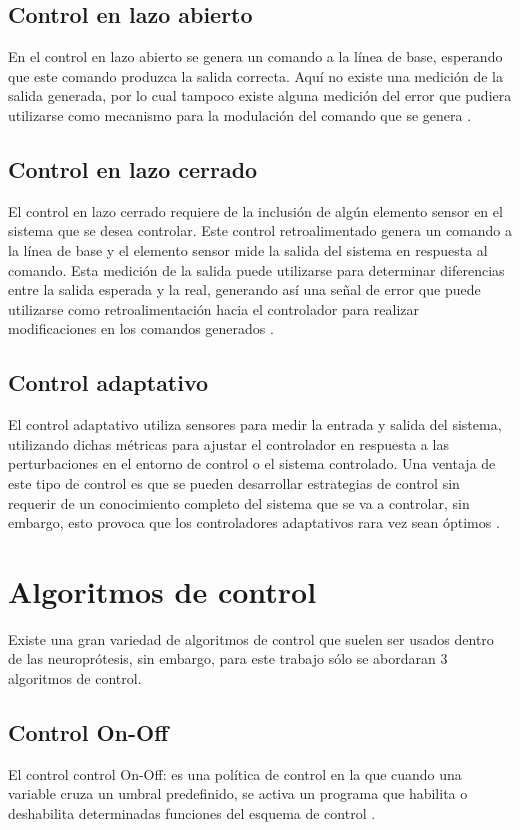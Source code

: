 \subsection{Control en lazo abierto}
En el control en lazo abierto se genera un comando a la línea de base, esperando que este comando produzca la salida correcta. Aquí no existe una medición de la salida generada, por lo cual tampoco existe alguna medición del error que pudiera utilizarse como mecanismo para la modulación del comando que se genera \cite{Wright2016}.

\subsection{Control en lazo cerrado}
El control en lazo cerrado requiere de la inclusión de algún elemento sensor en el sistema que se desea controlar. Este control retroalimentado genera un comando a la línea de base y el elemento sensor mide la salida del sistema en respuesta al comando. Esta medición de la salida puede utilizarse para determinar diferencias entre la salida esperada y la real, generando así una señal de error que puede utilizarse como retroalimentación hacia el controlador para realizar modificaciones en los comandos generados \cite{Wright2016}.

\subsection{Control adaptativo}
El control adaptativo utiliza sensores para medir la entrada y salida del sistema, utilizando dichas métricas para ajustar el controlador en respuesta a las perturbaciones en el entorno de control o el sistema controlado. Una ventaja de este tipo de control es que se pueden desarrollar estrategias de control sin requerir de un conocimiento completo del sistema que se va a controlar, sin embargo, esto provoca que los controladores adaptativos rara vez sean óptimos \cite{Wright2016}.

\section{Algoritmos de control}
Existe una gran variedad de algoritmos de control que suelen ser usados dentro de las neuroprótesis, sin embargo, para este trabajo sólo se abordaran 3 algoritmos de control.

\subsection{Control On-Off}
El control control On-Off: es una política de control en la que cuando una variable cruza un umbral predefinido, se activa un programa que habilita o deshabilita determinadas funciones del esquema de control \cite{Wright2016}.

